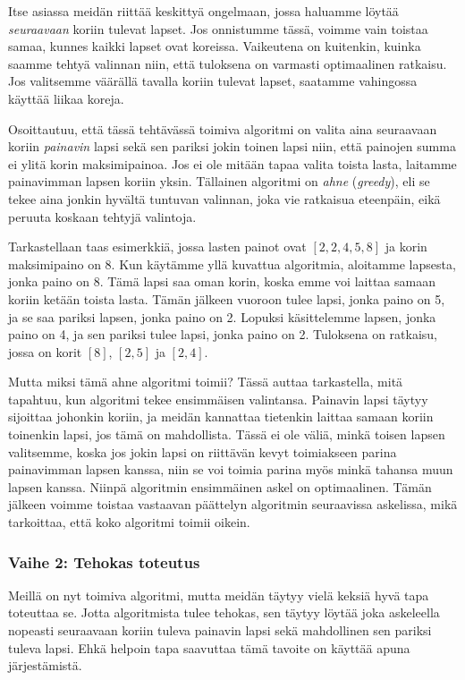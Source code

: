Itse asiassa meidän riittää keskittyä ongelmaan,
jossa haluamme löytää \emph{seuraavaan} koriin
tulevat lapset.
Jos onnistumme tässä, voimme vain toistaa samaa,
kunnes kaikki lapset ovat koreissa.
Vaikeutena on kuitenkin, kuinka saamme tehtyä valinnan niin,
että tuloksena on varmasti optimaalinen ratkaisu.
Jos valitsemme väärällä tavalla koriin tulevat lapset,
saatamme vahingossa käyttää liikaa koreja.


Osoittautuu, että tässä tehtävässä toimiva algoritmi
on valita aina seuraavaan koriin \emph{painavin} lapsi sekä sen pariksi
jokin toinen lapsi niin, että painojen summa ei ylitä
korin maksimipainoa.
Jos ei ole mitään tapaa valita toista lasta,
laitamme painavimman lapsen koriin yksin.
Tällainen algoritmi on \emph{ahne} (\emph{greedy}), eli se tekee aina jonkin
hyvältä tuntuvan valinnan, joka vie ratkaisua eteenpäin,
eikä peruuta koskaan tehtyjä valintoja.

Tarkastellaan taas esimerkkiä,
jossa lasten painot ovat $[2,2,4,5,8]$
ja korin maksimipaino on 8.
Kun käytämme yllä kuvattua algoritmia,
aloitamme lapsesta, jonka paino on 8.
Tämä lapsi saa oman korin, koska emme voi laittaa
samaan koriin ketään toista lasta.
Tämän jälkeen vuoroon tulee lapsi, jonka paino on 5,
ja se saa pariksi lapsen, jonka paino on 2.
Lopuksi käsittelemme lapsen, jonka paino on 4,
ja sen pariksi tulee lapsi, jonka paino on 2.
Tuloksena on ratkaisu, jossa on korit $[8]$, $[2,5]$ ja $[2,4]$.

Mutta miksi tämä ahne algoritmi toimii?
Tässä auttaa tarkastella, mitä tapahtuu,
kun algoritmi tekee ensimmäisen valintansa.
Painavin lapsi täytyy sijoittaa johonkin koriin,
ja meidän kannattaa tietenkin laittaa samaan koriin toinenkin lapsi,
jos tämä on mahdollista.
Tässä ei ole väliä, minkä toisen lapsen valitsemme,
koska jos jokin lapsi on riittävän kevyt toimiakseen
parina painavimman lapsen kanssa, niin se voi toimia parina
myös minkä tahansa muun lapsen kanssa.
Niinpä algoritmin ensimmäinen askel on optimaalinen.
Tämän jälkeen voimme toistaa vastaavan päättelyn
algoritmin seuraavissa askelissa, mikä tarkoittaa,
että koko algoritmi toimii oikein.

\subsubsection{Vaihe 2: Tehokas toteutus}

Meillä on nyt toimiva algoritmi,
mutta meidän täytyy vielä keksiä hyvä tapa toteuttaa se.
Jotta algoritmista tulee tehokas,
sen täytyy löytää joka askeleella nopeasti seuraavaan
koriin tuleva painavin lapsi sekä mahdollinen sen pariksi tuleva lapsi.
Ehkä helpoin tapa saavuttaa tämä tavoite on käyttää apuna järjestämistä.

